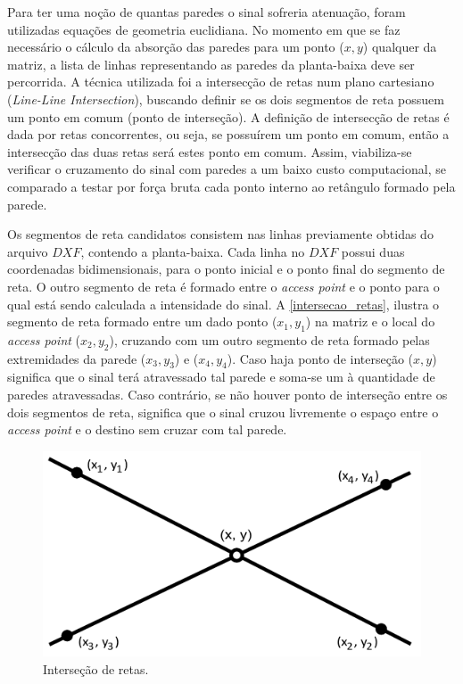 \documentclass[
	12pt,				%
	twoside,			%
	a4paper,			%
	english,			%
	french,				%
	spanish,			%
	brazil				%
	]{abntex2}
\begin{document}
Para ter uma noção de quantas paredes o sinal sofreria atenuação, foram
utilizadas equações de geometria euclidiana. No momento em que se faz
necessário o cálculo da absorção das paredes para um ponto (\(x, y\))
qualquer da matriz, a lista de linhas representando as paredes da
planta-baixa deve ser percorrida. A técnica utilizada foi a intersecção
de retas num plano cartesiano (\emph{Line-Line Intersection}), buscando
definir se os dois segmentos de reta possuem um ponto em comum (ponto de
interseção). A definição de intersecção de retas é dada por retas
concorrentes, ou seja, se possuírem um ponto em comum, então a
intersecção das duas retas será estes ponto em comum. Assim,
viabiliza-se verificar o cruzamento do sinal com paredes a um baixo
custo computacional, se comparado a testar por força bruta cada ponto
interno ao retângulo formado pela parede.

Os segmentos de reta candidatos consistem nas linhas previamente obtidas
do arquivo \(DXF\), contendo a planta-baixa. Cada linha no \(DXF\)
possui duas coordenadas bidimensionais, para o ponto inicial e o ponto
final do segmento de reta. O outro segmento de reta é formado entre o
\emph{access point} e o ponto para o qual está sendo calculada a
intensidade do sinal. A \autoref{intersecao_retas}, ilustra o segmento
de reta formado entre um dado ponto (\(x_{1}, y_{1}\)) na matriz e o
local do \emph{access point} (\(x_{2}, y_{2}\)), cruzando com um outro
segmento de reta formado pelas extremidades da parede (\(x_{3}, y_{3}\))
e (\(x_{4}, y_{4}\)). Caso haja ponto de interseção (\(x, y\)) significa
que o sinal terá atravessado tal parede e soma-se um à quantidade de
paredes atravessadas. Caso contrário, se não houver ponto de interseção
entre os dois segmentos de reta, significa que o sinal cruzou livremente
o espaço entre o \emph{access point} e o destino sem cruzar com tal
parede.

\begin{figure}[!ht]
    \caption{\label{intersecao_retas} Interseção de retas.}
    \begin{center}
        \includegraphics[scale=0.5]{imagens/inter.jpg}
    \end{center}
\end{figure}
\end{document}
